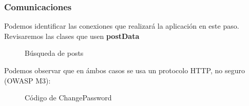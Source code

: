 \documentclass[12pt,twoside]{article}
\begin{document}
\subsubsection{Comunicaciones}
Podemos identificar las conexiones que realizará la aplicación en este paso. Revisaremos las clases que usen \textbf{postData}
\begin{figure}[H]
    \centering
    \caption{Búsqueda de posts}
\end{figure}
Podemos observar que en ámbos casos se usa un protocolo HTTP, no seguro (OWASP M3):
\begin{figure}[H]
    \centering
    \caption{Código de ChangePassword}
\end{figure}
\end{document}
